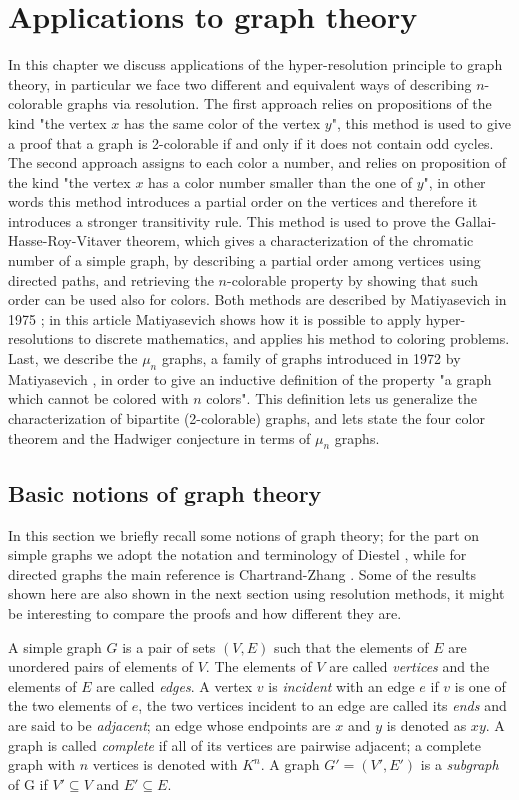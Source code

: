 \documentclass[a4paper,12pt,oneside]{book}
\begin{document}
\chapter{Applications to graph theory}%
In this chapter we discuss applications of the hyper-resolution principle to graph theory, in particular we  face two different and equivalent ways of describing $n$-colorable graphs via resolution. The first approach relies on propositions of the kind "the vertex $x$ has the same color of the vertex $y$", this method is used to give a proof that a graph is 2-colorable if and only if it does not contain odd cycles. The second approach assigns to each color a number, and relies on proposition of the kind "the vertex $x$ has a color number smaller than the one of $y$", in other words this method introduces a partial order on the vertices and therefore it introduces a stronger transitivity rule. This method is used to prove the Gallai-Hasse-Roy-Vitaver theorem, which gives a characterization of the chromatic number of a simple graph, by describing a partial order among vertices using directed paths, and retrieving the $n$-colorable property by showing that such order can be used also for colors. 
Both methods are described by Matiyasevich in 1975 \cite{mat-1}; in this article Matiyasevich shows how it is possible to apply hyper-resolutions to discrete mathematics, and applies his method to coloring problems.
Last, we describe the $\mu_n$ graphs, a family of graphs introduced in 1972 by Matiyasevich \cite{mat-2}, in order to give an inductive definition of the property "a graph which cannot be colored with $n$ colors". This definition lets us generalize the characterization of bipartite (2-colorable) graphs, and lets state the four color theorem and the Hadwiger conjecture in terms of $\mu_n$ graphs.


\section{Basic notions of graph theory}

In this section we briefly recall some notions of graph theory; for the part on simple graphs we adopt the notation and terminology of Diestel \cite{diestel}, while for directed graphs the main reference is Chartrand-Zhang \cite{chrom}. Some of the results shown here are also shown in the next section using resolution methods, it might be interesting to compare the proofs and how different they are.

A simple graph $G$ is a pair of sets $(V,E)$ such that the elements of $E$ are unordered pairs of elements of $V$. The elements of $V$ are called \textit{vertices} and the elements of $E$ are called \textit{edges}. A vertex $v$ is \textit{incident} with an edge $e$ if $v$ is one of the two elements of $e$, the two vertices incident to an edge are called its \textit{ends} and are said to be \textit{adjacent}; an edge whose endpoints are $x$ and $y$ is denoted as $xy$. A graph is called  \textit{complete} if all of its vertices are pairwise adjacent; a complete graph with $n$ vertices is denoted with $K^n$.
A graph $G'=(V',E')$ is a \textit{subgraph} of G if $V' \subseteq V$ and $E' \subseteq E$.
\end{document}
